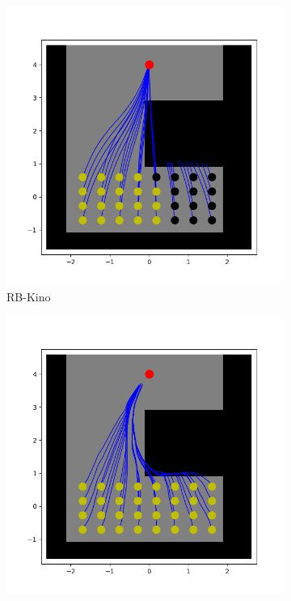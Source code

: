 \begin{figure}
\begin{subfigure}[t]{0.49\linewidth}
    \includegraphics[width=\textwidth]{Figures/Chapter_LEAS/hole_p1_kino.png}
    \caption{RB-Kino}
    \end{subfigure}
    \begin{subfigure}[t]{0.49\linewidth}
    \includegraphics[width=\textwidth]{Figures/Chapter_LEAS/hole_p1_leas.png}

\end{subfigure}
\end{figure}

